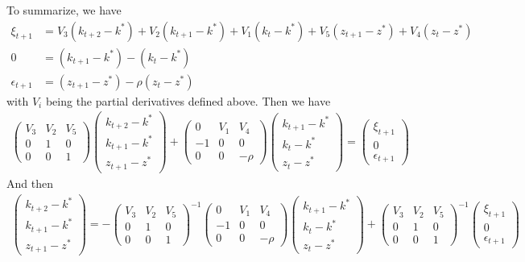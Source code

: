 \documentclass[a4paper]{article}
\theoremstyle{definition}
\begin{document}
To summarize, we have
	\begin{align*}
	 \xi_{t+1}			&= V_3(k_{t+2}-k^*)+V_2(k_{t+1}-k^*)+V_1(k_{t}-k^*)+V_5(z_{t+1}-z^*)+V_4(z_{t}-z^*)  \\
	 0 					&= (k_{t+1}-k^*)-(k_{t}-k^*) \\
	 \epsilon_{t+1}	&= (z_{t+1}-z^*) - \rho (z_{t}-z^*)
	\end{align*}
with $V_i$ being the partial derivatives defined above.	 Then we have
	\begin{align*}
		\begin{pmatrix}
		V_3 & V_2 & V_5 \\ 0 & 1 & 0 \\ 0 & 0 & 1 
		\end{pmatrix}
		\begin{pmatrix}
		k_{t+2}-k^* \\ k_{t+1}-k^* \\ z_{t+1}-z^* 
		\end{pmatrix}
	+ 
		\begin{pmatrix}
		0 & V_1 & V_4 \\ -1 & 0 & 0 \\ 0 & 0 & -\rho
		\end{pmatrix}
		\begin{pmatrix}
		k_{t+1}-k^* \\ k_t-k^* \\ z_t-z^*
		\end{pmatrix}
	= 
		\begin{pmatrix}
		\xi_{t+1} \\ 0 \\ \epsilon_{t+1}
		\end{pmatrix}	
	\end{align*}
And then	
	\begin{align*}
		\begin{pmatrix}
		k_{t+2}-k^* \\ k_{t+1}-k^* \\ z_{t+1}-z^* 
		\end{pmatrix}
	= 	
	-	
		\begin{pmatrix}
		V_3 & V_2 & V_5 \\ 0 & 1 & 0 \\ 0 & 0 & 1 
		\end{pmatrix}^{-1}
		\begin{pmatrix}
		0 & V_1 & V_4 \\ -1 & 0 & 0 \\ 0 & 0 & -\rho
		\end{pmatrix}
		\begin{pmatrix}
		k_{t+1}-k^* \\ k_t-k^* \\ z_t-z^*
		\end{pmatrix}
	+
		\begin{pmatrix}
		V_3 & V_2 & V_5 \\ 0 & 1 & 0 \\ 0 & 0 & 1 
		\end{pmatrix}^{-1}	
		\begin{pmatrix}
		\xi_{t+1} \\ 0 \\ \epsilon_{t+1}
		\end{pmatrix}		
	\end{align*}
\end{document}
